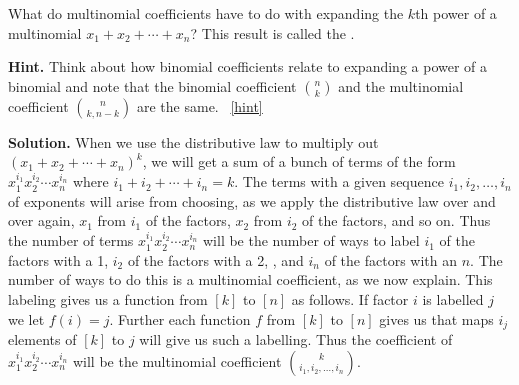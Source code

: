 \documentclass{book}
\begin{document}
\setcounter{project}{284}
\addtocounter{project}{-1}
\begin{activity}[]\label{activity-277}
\hypertarget{p-1465}{}%
What do multinomial coefficients have to do with expanding the \(k\)th power of a multinomial \(x_1+x_2+\cdots+x_n\)? This result is called the .%
\par\smallskip%
\noindent\textbf{Hint.}\hypertarget{hint-186}{}\quad%
\hypertarget{p-1466}{}%
Think about how binomial coefficients relate to expanding a power of a binomial and note that the binomial coefficient \(\binom{n}{k}\) and the multinomial coefficient \(\binom{n}{k,n-k}\) are the same.%
~\hfill{\tiny\hyperlink{a-284}{[hint]}\hypertarget{q-284}{}}\par\smallskip%
\noindent\textbf{Solution.}\hypertarget{solution-197}{}\quad%
\hypertarget{p-1467}{}%
When we use the distributive law to multiply out \((x_1+x_2+\cdots +x_n)^k\), we will get a sum of a bunch of terms of the form \(x_1^{i_1}x_2^{i_2}\cdots x_n^{i_n}\) where \(i_1+i_2+\cdots+ i_n=k\).  The terms with a given sequence \(i_1,i_2,\ldots, i_n\) of exponents will arise from choosing, as we apply the distributive law over and over again, \(x_1\) from \(i_1\) of the factors, \(x_2\) from \(i_2\) of the factors, and so on. Thus the number of terms \(x_1^{i_1}x_2^{i_2}\cdots x_n^{i_n}\) will be the number of ways to label \(i_1\) of the factors with a 1, \(i_2\) of the factors with a 2, \textellipsis{}, and \(i_n\) of the factors with an \(n\). The number of ways to do this is a multinomial coefficient, as we now explain. This labeling gives us a function from \([k]\) to \([n]\) as follows. If factor \(i\) is labelled \(j\) we let \(f(i) =j\). Further each function \(f\) from \([k]\) to \([n]\) gives us that maps \(i_j\) elements of \([k]\) to \(j\) will give us such a labelling. Thus the coefficient of \(x_1^{i_1}x_2^{i_2}\cdots x_n^{i_n}\) will be the multinomial coefficient \(\binom{k}{i_1,i_2,\ldots, i_n}\).%
\end{activity}
\end{document}
